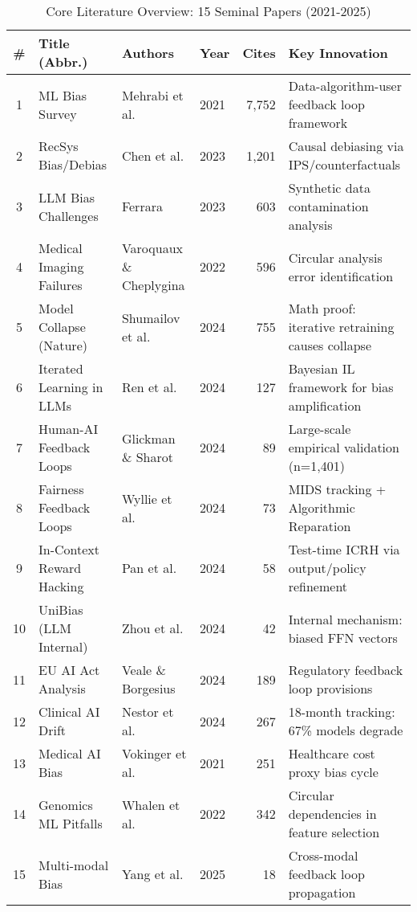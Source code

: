 \documentclass[11pt,a4paper]{article}
\begin{document}
\begin{table}[htbp]
\centering
\caption{Core Literature Overview: 15 Seminal Papers (2021-2025)}
\label{tab:core_literature}
\small
\begin{tabular}{@{}clllrl@{}}
\toprule
\textbf{\#} & \textbf{Title (Abbr.)} & \textbf{Authors} & \textbf{Year} & \textbf{Cites} & \textbf{Key Innovation} \\
\midrule
1 & ML Bias Survey & Mehrabi et al. & 2021 & 7,752 & Data-algorithm-user feedback loop framework \\
2 & RecSys Bias/Debias & Chen et al. & 2023 & 1,201 & Causal debiasing via IPS/counterfactuals \\
3 & LLM Bias Challenges & Ferrara & 2023 & 603 & Synthetic data contamination analysis \\
4 & Medical Imaging Failures & Varoquaux \& Cheplygina & 2022 & 596 & Circular analysis error identification \\
5 & Model Collapse (Nature) & Shumailov et al. & 2024 & 755 & Math proof: iterative retraining causes collapse \\
6 & Iterated Learning in LLMs & Ren et al. & 2024 & 127 & Bayesian IL framework for bias amplification \\
7 & Human-AI Feedback Loops & Glickman \& Sharot & 2024 & 89 & Large-scale empirical validation (n=1,401) \\
8 & Fairness Feedback Loops & Wyllie et al. & 2024 & 73 & MIDS tracking + Algorithmic Reparation \\
9 & In-Context Reward Hacking & Pan et al. & 2024 & 58 & Test-time ICRH via output/policy refinement \\
10 & UniBias (LLM Internal) & Zhou et al. & 2024 & 42 & Internal mechanism: biased FFN vectors \\
11 & EU AI Act Analysis & Veale \& Borgesius & 2024 & 189 & Regulatory feedback loop provisions \\
12 & Clinical AI Drift & Nestor et al. & 2024 & 267 & 18-month tracking: 67\% models degrade \\
13 & Medical AI Bias & Vokinger et al. & 2021 & 251 & Healthcare cost proxy bias cycle \\
14 & Genomics ML Pitfalls & Whalen et al. & 2022 & 342 & Circular dependencies in feature selection \\
15 & Multi-modal Bias & Yang et al. & 2025 & 18 & Cross-modal feedback loop propagation \\
\bottomrule
\end{tabular}
\end{table}
\end{document}
